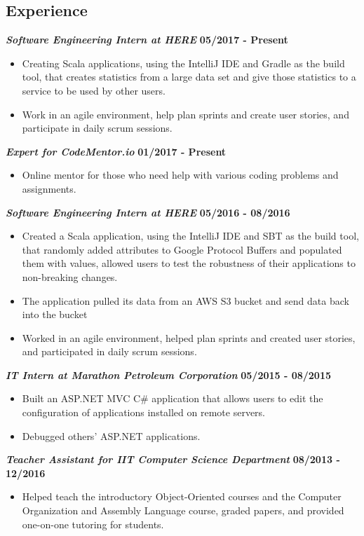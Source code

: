 \documentclass[10pt]{res}
\begin{document}
\begin{resume}
\section{Experience}
	\textbf{\textit{Software Engineering Intern at HERE}}
	\hfill{\bf 05/2017 - Present}
	\begin{itemize}
		\item Creating Scala applications, using the IntelliJ IDE and Gradle as the build tool, that creates statistics from a large data set and give those statistics to a service to be used by other users. 
\item Work in an agile environment, help plan sprints and create user stories, and participate in daily scrum sessions. 
	\end{itemize}
\textbf{\textit{Expert for CodeMentor.io}}
	\hfill{\bf 01/2017 - Present}
	\begin{itemize}
		\item Online mentor for those who need help with various coding problems and assignments. 
	\end{itemize}
	\textbf{\textit{Software Engineering Intern at HERE}}
	\hfill {\bf 05/2016 - 08/2016}
	\begin{itemize}
	  \item Created a Scala application, using the IntelliJ IDE and SBT as the build tool, that randomly added attributes to Google Protocol Buffers 
 and populated them with values, allowed users to test the robustness of their applications to non-breaking changes.
	\item The application pulled its data from an AWS S3 bucket and send data back into the bucket
\item Worked in an agile environment, helped plan sprints and created user stories, and participated in daily scrum sessions. 
	\end{itemize}  
	\textbf{\textit{IT Intern at Marathon Petroleum Corporation}} \hfill {\bf 05/2015 - 08/2015}
	\begin{itemize}
  \setlength\itemsep{0em}
	  \item Built an ASP.NET MVC C\# application that allows users to edit the configuration of applications installed on remote servers.
	  \item Debugged others' ASP.NET applications.
\end{itemize}

	\textbf{\textit{Teacher Assistant for IIT Computer Science Department}} 
	\hfill {\bf 08/2013 - 12/2016}
	\begin{itemize}
	  \item Helped teach the introductory Object-Oriented courses and the Computer Organization and Assembly Language course, graded papers, and provided one-on-one tutoring for students. 
	\end{itemize}
	

\end{resume}
\end{document}
